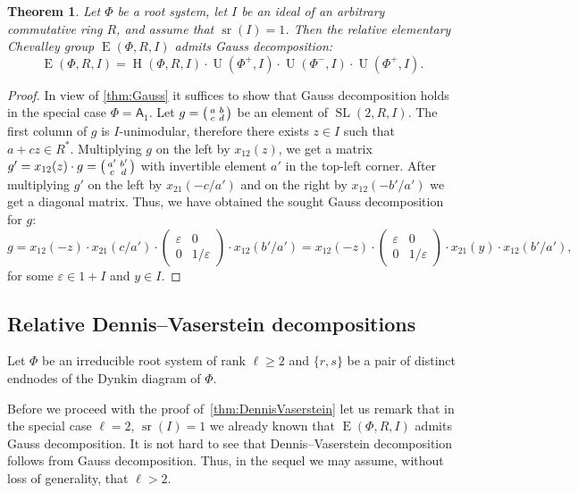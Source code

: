\documentclass[11pt]{amsart}
\theoremstyle{plain}
\newtheorem{thm}{Theorem}
\numberwithin{equation}{section}
\numberwithin{lemma}{section}
\theoremstyle{definition}
\theoremstyle{remark}
\DeclareMathOperator{\SL}{SL}
\DeclareMathOperator{\E}{E}
\DeclareMathOperator{\Hh}{H}
\DeclareMathOperator{\U}{U}
\DeclareMathOperator{\sr}{sr}
\newcommand{\rA}{\mathsf{A}}
\begin{document}
\begin{thm}\label{thm:srRI1}
Let $\Phi$ be a root system, let $I$ be an ideal of an arbitrary commutative ring $R$, and assume that $\sr(I)=1$.
Then the relative elementary Chevalley group $\E(\Phi, R, I)$ admits Gauss decomposition:
\[ \E(\Phi, R, I) = \Hh(\Phi, R, I) \cdot \U(\Phi^+, I) \cdot \U(\Phi^-, I) \cdot \U(\Phi^+, I). \]
\end{thm}
\begin{proof}
In view of \cref{thm:Gauss} it suffices to show that Gauss decomposition holds in the special case $\Phi=\rA_1$.
Let $g=\begin{psmallmatrix}a & b \\ c & d\end{psmallmatrix}$ be an element of $\SL(2, R, I)$.
The first column of $g$ is $I$-unimodular, therefore there exists $z\in I$ such that $a+cz\in R^*$.
Multiplying $g$ on the left by $x_{12}(z)$, we get a matrix $g'=x_{12}(z)\cdot g=\begin{psmallmatrix}a' & b' \\ c & d\end{psmallmatrix}$ with invertible element $a'$ in the top-left corner.
After multiplying $g'$ on the left by $x_{21}(-c/a')$ and on the right by $x_{12}(-b'/a')$ we get a diagonal matrix. 
Thus, we have obtained the sought Gauss decomposition for $g$:
\begin{equation*}
g=x_{12}(-z)\cdot x_{21}(c/a')\cdot
\begin{pmatrix} \varepsilon & 0 \\ 0 & 1/\varepsilon \end{pmatrix}
\cdot x_{12}(b'/a')=x_{12}(-z)\cdot
\begin{pmatrix} \varepsilon & 0 \\ 0 & 1/\varepsilon \end{pmatrix}
\cdot x_{21}(y) \cdot x_{12}(b'/a'), 
\end{equation*}
for some $\varepsilon\in 1+I$ and $y\in I$. \end{proof}

\subsection{Relative Dennis--Vaserstein decompositions}\label{sec:dennis-vaserstein}
Let $\Phi$ be an irreducible root system of rank $\ell\geq 2$ and $\{r, s\}$ be a pair of distinct endnodes of the Dynkin diagram of $\Phi$.

Before we proceed with the proof of~\cref{thm:DennisVaserstein} let us remark that in the special case $\ell=2$, $\sr(I)= 1$
 we already known that $\E(\Phi, R, I)$ admits Gauss decomposition.
It is not hard to see that Dennis--Vaserstein decomposition follows from Gauss decomposition.
Thus, in the sequel we may assume, without loss of generality, that $\ell > 2$.
\end{document}

